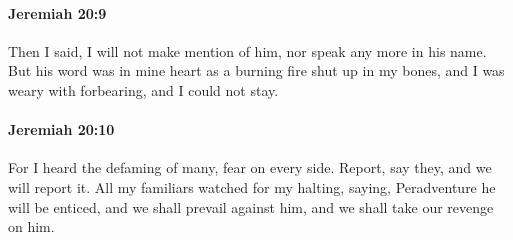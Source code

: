 		\paragraph{Jeremiah 20:9} %
			\label{JEREMIAH-20-9}

			Then I said, I will not make mention of him, nor speak any more in his name. But his word was in mine heart as a burning fire shut up in my bones, and I was weary with forbearing, and I could not stay.


		\paragraph{Jeremiah 20:10} %
			\label{JEREMIAH-20-10}

			For I heard the defaming of many, fear on every side. Report, say they, and we will report it. All my familiars watched for my halting, saying, Peradventure he will be enticed, and we shall prevail against him, and we shall take our revenge on him.

